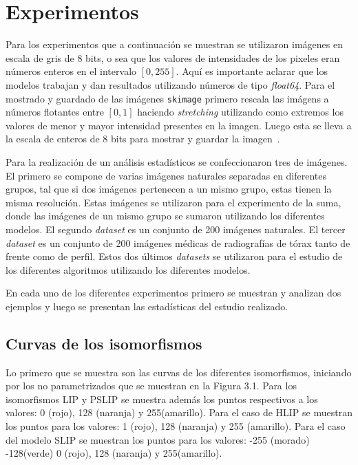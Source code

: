 \section{Experimentos}
Para los experimentos que a continuaci\'on se muestran se utilizaron im\'agenes en escala de gris de 8 bits, o sea que los valores de intensidades de los pixeles eran n\'umeros enteros en el intervalo $[0,255]$. Aqu\'i es importante aclarar que los modelos trabajan y dan resultados utilizando n\'umeros de tipo \textit{float64}. Para el mostrado y guardado de las im\'agenes \verb|skimage| primero rescala las im\'agens a n\'umeros flotantes entre $[0,1]$ haciendo \textit{stretching} utilizando como extremos los valores de menor y mayor intensidad presentes en la imagen. Luego esta se lleva a la escala de enteros de 8 bits para mostrar y guardar la imagen~\cite{image_data_types_and_what_they_mean}.

Para la realizaci\'on de un an\'alisis estad\'isticos se confeccionaron tres  de im\'agenes. El primero se compone de varias im\'agenes naturales separadas en diferentes grupos, tal que si dos im\'agenes pertenecen a un mismo grupo, estas tienen la misma resoluci\'on. Estas im\'agenes se utilizaron para el experimento de la suma, donde las im\'agenes de un mismo grupo se sumaron utilizando los diferentes modelos. El segundo \textit{dataset} es un conjunto de 200 im\'agenes naturales. El tercer \textit{dataset} es un conjunto de 200 im\'agenes m\'edicas de radiograf\'ias de t\'orax tanto de frente como de perfil. Estos dos \'ultimos \textit{datasets} se utilizaron para el estudio de los diferentes algoritmos utilizando los diferentes modelos.

En cada uno de los diferentes experimentos primero se muestran y analizan dos ejemplos y luego se presentan las estad\'isticas del estudio realizado.

\subsection{Curvas de los isomorfismos}
Lo primero que se muestra son las curvas de los diferentes isomorfismos, iniciando por los no parametrizados que se muestran en la Figura 3.1. Para los isomorfismos LIP y PSLIP se muestra adem\'as los puntos respectivos a los valores: 0 (rojo), 128 (naranja) y 255(amarillo). Para el caso de HLIP se muestran los puntos para los valores: 1 (rojo), 128 (naranja) y 255 (amarillo). Para el caso del modelo SLIP se muestran los puntos para los valores: -255 (morado) -128(verde) 0 (rojo), 128 (naranja) y 255(amarillo).

